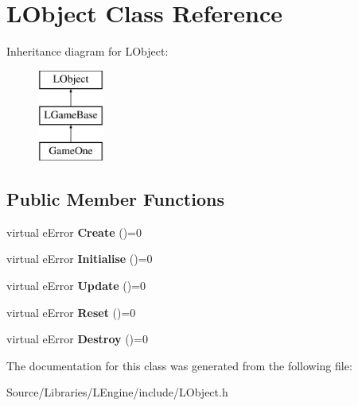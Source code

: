\hypertarget{class_l_object}{\section{L\-Object Class Reference}
\label{class_l_object}
}
Inheritance diagram for L\-Object\-:\begin{figure}[H]
\begin{center}
\leavevmode
\includegraphics[height=3.000000cm]{class_l_object}
\end{center}
\end{figure}
\subsection*{Public Member Functions}
\begin{DoxyCompactItemize}
\item 
\hypertarget{class_l_object_a121190dfa412ad2d04900601cf5be9d8}{virtual e\-Error {\bfseries Create} ()=0}\label{class_l_object_a121190dfa412ad2d04900601cf5be9d8}

\item 
\hypertarget{class_l_object_aa7775558c54712e90d9f851d1069799d}{virtual e\-Error {\bfseries Initialise} ()=0}\label{class_l_object_aa7775558c54712e90d9f851d1069799d}

\item 
\hypertarget{class_l_object_a08a1f5faba2754f42e431d7b2a28fe95}{virtual e\-Error {\bfseries Update} ()=0}\label{class_l_object_a08a1f5faba2754f42e431d7b2a28fe95}

\item 
\hypertarget{class_l_object_ab8b747a026d8683c242d1a5c52ba6def}{virtual e\-Error {\bfseries Reset} ()=0}\label{class_l_object_ab8b747a026d8683c242d1a5c52ba6def}

\item 
\hypertarget{class_l_object_ac57da01b8d4eddd57d2fed543118e931}{virtual e\-Error {\bfseries Destroy} ()=0}\label{class_l_object_ac57da01b8d4eddd57d2fed543118e931}

\end{DoxyCompactItemize}


The documentation for this class was generated from the following file\-:\begin{DoxyCompactItemize}
\item 
Source/\-Libraries/\-L\-Engine/include/L\-Object.\-h\end{DoxyCompactItemize}
